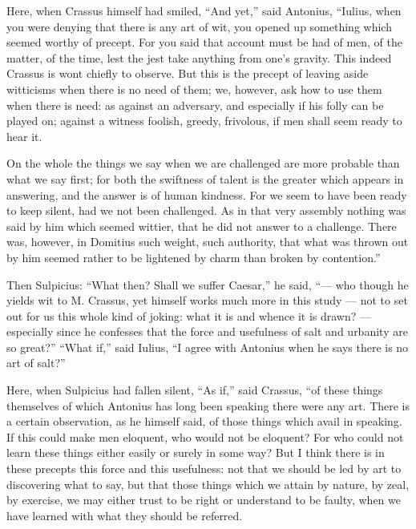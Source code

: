  Here, when Crassus himself had smiled, ``And yet,'' said Antonius, ``Iulius, when you were denying that there is any art of wit, you opened up something which seemed worthy of precept. For you said that account must be had of men, of the matter, of the time, lest the jest take anything from one's gravity. This indeed Crassus is wont chiefly to observe. But this is the precept of leaving aside witticisms when there is no need of them; we, however, ask how to use them when there is need: as against an adversary, and especially if his folly can be played on; against a witness foolish, greedy, frivolous, if men shall seem ready to hear it.

 On the whole the things we say when we are challenged are more probable than what we say first; for both the swiftness of talent is the greater which appears in answering, and the answer is of human kindness. For we seem to have been ready to keep silent, had we not been challenged. As in that very assembly nothing was said by him which seemed wittier, that he did not answer to a challenge. There was, however, in Domitius such weight, such authority, that what was thrown out by him seemed rather to be lightened by charm than broken by contention.''

 Then Sulpicius: ``What then? Shall we suffer Caesar,'' he said, ``— who though he yields wit to M. Crassus, yet himself works much more in this study — not to set out for us this whole kind of joking: what it is and whence it is drawn? — especially since he confesses that the force and usefulness of salt and urbanity are so great?'' ``What if,'' said Iulius, ``I agree with Antonius when he says there is no art of salt?''

 Here, when Sulpicius had fallen silent, ``As if,'' said Crassus, ``of these things themselves of which Antonius has long been speaking there were any art. There is a certain observation, as he himself said, of those things which avail in speaking. If this could make men eloquent, who would not be eloquent? For who could not learn these things either easily or surely in some way? But I think there is in these precepts this force and this usefulness: not that we should be led by art to discovering what to say, but that those things which we attain by nature, by zeal, by exercise, we may either trust to be right or understand to be faulty, when we have learned with what they should be referred.

